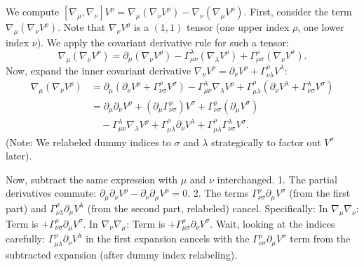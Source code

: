 \documentclass[11pt, a4paper]{report}
\begin{document}
We compute \([\nabla_\mu, \nabla_\nu] V^\rho = \nabla_\mu (\nabla_\nu V^\rho) - \nabla_\nu (\nabla_\mu V^\rho)\).
First, consider the term \(\nabla_\mu (\nabla_\nu V^\rho)\). Note that \(\nabla_\nu V^\rho\) is a \((1,1)\) tensor (one upper index \(\rho\), one lower index \(\nu\)). We apply the covariant derivative rule for such a tensor:
\begin{equation}
\nabla_\mu (\nabla_\nu V^\rho) = \partial_\mu (\nabla_\nu V^\rho) - \Gamma^\lambda_{\mu\nu} (\nabla_\lambda V^\rho) + \Gamma^\rho_{\mu\sigma} (\nabla_\nu V^\sigma).
\end{equation}
Now, expand the inner covariant derivative \(\nabla_\nu V^\rho = \partial_\nu V^\rho + \Gamma^\rho_{\nu\lambda} V^\lambda\):
\begin{align}
\nabla_\mu (\nabla_\nu V^\rho) &= \partial_\mu (\partial_\nu V^\rho + \Gamma^\rho_{\nu\sigma} V^\sigma) - \Gamma^\lambda_{\mu\nu} \nabla_\lambda V^\rho + \Gamma^\rho_{\mu\lambda} (\partial_\nu V^\lambda + \Gamma^\lambda_{\nu\sigma} V^\sigma) \nonumber \\
&= \partial_\mu \partial_\nu V^\rho + (\partial_\mu \Gamma^\rho_{\nu\sigma}) V^\sigma + \Gamma^\rho_{\nu\sigma} (\partial_\mu V^\sigma) \nonumber \\
&\quad - \Gamma^\lambda_{\mu\nu} \nabla_\lambda V^\rho + \Gamma^\rho_{\mu\lambda} \partial_\nu V^\lambda + \Gamma^\rho_{\mu\lambda} \Gamma^\lambda_{\nu\sigma} V^\sigma.
\end{align}
(Note: We relabeled dummy indices to \(\sigma\) and \(\lambda\) strategically to factor out \(V^\sigma\) later).

Now, subtract the same expression with \(\mu\) and \(\nu\) interchanged.
1. The partial derivatives commute: \(\partial_\mu \partial_\nu V^\rho - \partial_\nu \partial_\mu V^\rho = 0\).
2. The terms \(\Gamma^\rho_{\nu\sigma} \partial_\mu V^\sigma\) (from the first part) and \(\Gamma^\rho_{\nu\lambda} \partial_\mu V^\lambda\) (from the second part, relabeled) cancel. Specifically:
   In \(\nabla_\mu \nabla_\nu\): Term is \(+ \Gamma^\rho_{\nu\sigma} \partial_\mu V^\sigma\).
   In \(\nabla_\nu \nabla_\mu\): Term is \(+ \Gamma^\rho_{\mu\sigma} \partial_\nu V^\sigma\).
   Wait, looking at the indices carefully: \(\Gamma^\rho_{\mu\lambda} \partial_\nu V^\lambda\) in the first expansion cancels with the \(\Gamma^\rho_{\nu\sigma} \partial_\mu V^\sigma\) term from the subtracted expansion (after dummy index relabeling).
\end{document}
